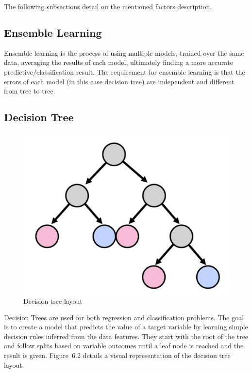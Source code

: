 The following subsections %
detail on the mentioned factors description.

\subsection{Ensemble Learning}

Ensemble learning is the process of using multiple models, trained
over the same data, averaging the results of each model, ultimately
finding a more accurate predictive/classification result. The
requirement for ensemble learning is that the errors of each model (in
this case decision tree) are independent and different from tree to
tree.

\subsection{Decision Tree}

\begin{figure}[h]
\centering
\includegraphics[scale=.5]{./figures/dectree.png}
\caption{Decision tree layout}
\label{fig1}
\end{figure}

Decision Trees are used for both regression and classification
problems. The goal is to create a model that predicts the value of a
target variable by learning simple decision rules inferred from the
data features. They start with the root of the tree and follow splits
based on variable outcomes until a leaf node is reached and the result
is given. Figure~6.2 details a visual representation of the decision
tree layout.

